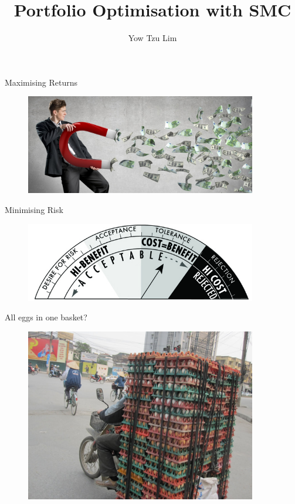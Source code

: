\documentclass[handout]{beamer}
\title{Portfolio Optimisation with SMC}
\author{Yow Tzu Lim}
\begin{document}
\begin{frame}
\maketitle
\end{frame}

\begin{frame}{Maximising Returns}
  \begin{figure}
    \centering
    \includegraphics[width = 0.9\textwidth]{figure/magnetmoney.jpg}
  \end{figure}
\end{frame}

\begin{frame}{Minimising Risk}
  \begin{figure}
    \centering
    \includegraphics[width = 0.9\textwidth]{figure/risk.jpg}
  \end{figure}
\end{frame}

\begin{frame}{All eggs in one basket?}
  \begin{figure}
    \centering
    \includegraphics[width = 0.9\textwidth]{figure/alleggs.jpg}
  \end{figure}
\end{frame}
\end{document}
